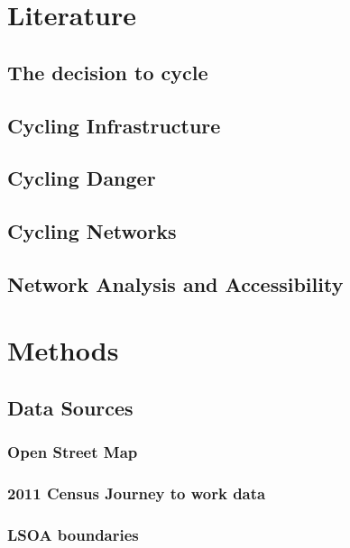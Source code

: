 \documentclass[11pt]{article} %
\begin{document}
\section{Literature}

\subsection{The decision to cycle}

\subsection{Cycling Infrastructure}

\subsection{Cycling Danger}

\subsection{Cycling Networks}

\subsection{Network Analysis and Accessibility}

\section{Methods}

\subsection{Data Sources}

\subsubsection{Open Street Map}

\subsubsection{2011 Census Journey to work data}

\subsubsection{LSOA boundaries}
\end{document}
